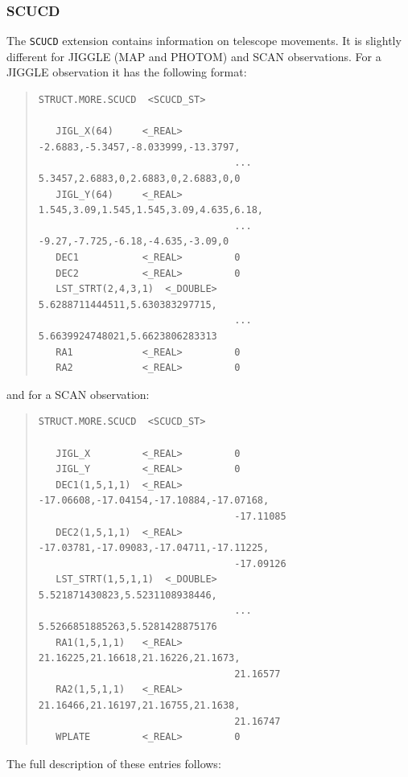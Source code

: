 \documentclass[twoside,11pt]{article}
\newenvironment{myquote}{\begin{quote}\begin{small}}{\end{small}\end{quote}}
\renewcommand{\_}{\texttt{\symbol{95}}}
\begin{document}
\subsubsection{SCUCD}

The \texttt{SCUCD} extension contains information on telescope movements.
It is slightly different for JIGGLE (MAP and PHOTOM) and SCAN observations.
For a JIGGLE observation it has the following format:

\begin{myquote}
\begin{verbatim}
STRUCT.MORE.SCUCD  <SCUCD_ST>

   JIGL_X(64)     <_REAL>         -2.6883,-5.3457,-8.033999,-13.3797,
                                  ... 5.3457,2.6883,0,2.6883,0,2.6883,0,0
   JIGL_Y(64)     <_REAL>         1.545,3.09,1.545,1.545,3.09,4.635,6.18,
                                  ... -9.27,-7.725,-6.18,-4.635,-3.09,0
   DEC1           <_REAL>         0
   DEC2           <_REAL>         0
   LST_STRT(2,4,3,1)  <_DOUBLE>   5.6288711444511,5.630383297715,
                                  ... 5.6639924748021,5.6623806283313
   RA1            <_REAL>         0
   RA2            <_REAL>         0
\end{verbatim}
\end{myquote}

and for a SCAN observation:

\begin{myquote}
\begin{verbatim}
STRUCT.MORE.SCUCD  <SCUCD_ST>

   JIGL_X         <_REAL>         0
   JIGL_Y         <_REAL>         0
   DEC1(1,5,1,1)  <_REAL>         -17.06608,-17.04154,-17.10884,-17.07168,
                                  -17.11085
   DEC2(1,5,1,1)  <_REAL>         -17.03781,-17.09083,-17.04711,-17.11225,
                                  -17.09126
   LST_STRT(1,5,1,1)  <_DOUBLE>   5.521871430823,5.5231108938446,
                                  ... 5.5266851885263,5.5281428875176
   RA1(1,5,1,1)   <_REAL>         21.16225,21.16618,21.16226,21.1673,
                                  21.16577
   RA2(1,5,1,1)   <_REAL>         21.16466,21.16197,21.16755,21.1638,
                                  21.16747
   WPLATE         <_REAL>         0
\end{verbatim}
\end{myquote}

The full description of these entries follows:
\end{document}
